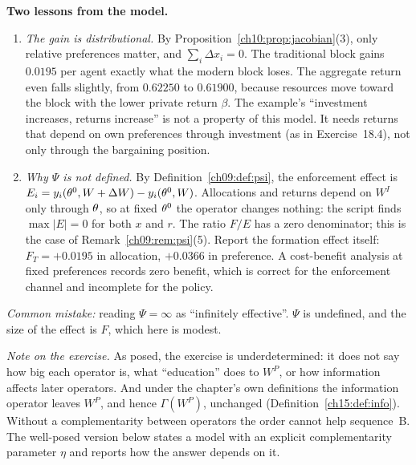 \documentclass[../solutions_manual.tex]{subfiles}
\begin{document}
 \textbf{Two lessons from the model.}
\begin{enumerate}
\item \emph{The gain is distributional.} By Proposition~\ref{ch10:prop:jacobian}(3), only relative preferences matter, and $\sum_i\Delta x_i = 0$. The traditional block gains $0.0195$ per agent exactly what the modern block loses. The aggregate return even falls slightly, from $0.62250$ to $0.61900$, because resources move toward the block with the lower private return $\beta$. The example's ``investment increases, returns increase'' is not a property of this model. It needs returns that depend on own preferences through investment (as in Exercise~18.4), not only through the bargaining position.
\item \emph{Why $\Psi$ is not defined.} By Definition~\ref{ch09:def:psi}, the enforcement effect is $E_i = y_i(\theta^0, W + \Delta W) - y_i(\theta^0, W)$. Allocations and returns depend on $W^I$ only through $\theta$, so at fixed $\theta^0$ the operator changes nothing: the script finds $\max|E| = 0$ for both $x$ and $r$. The ratio $F/E$ has a zero denominator; this is the case of Remark~\ref{ch09:rem:psi}(5). Report the formation effect itself: $F_T = +0.0195$ in allocation, $+0.0366$ in preference. A cost-benefit analysis at fixed preferences records zero benefit, which is correct for the enforcement channel and incomplete for the policy.
\end{enumerate}

\emph{Common mistake:} reading $\Psi = \infty$ as ``infinitely effective''. $\Psi$ is undefined, and the size of the effect is $F$, which here is modest.


\emph{Note on the exercise.} As posed, the exercise is underdetermined: it does not say how big each operator is, what ``education'' does to $W^P$, or how information affects later operators. And under the chapter's own definitions the information operator leaves $W^P$, and hence $\Gamma(W^P)$, unchanged (Definition~\ref{ch15:def:info}). Without a complementarity between operators the order cannot help sequence~B. The well-posed version below states a model with an explicit complementarity parameter $\eta$ and reports how the answer depends on it.
\end{document}
